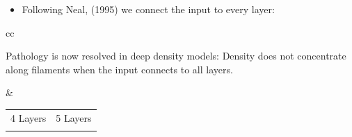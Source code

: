 \documentclass[portrait,a0b,final,a4resizeable]{include/a0poster}
\def\jointspacing{\vspace{0.3in}}
\begin{document}
\begin{poster}
\begin{multicols}{2}
\jointspacing
\jointspacing

\centering
\begin{itemize}
	\item Following {\color{mydarkblue} Neal, (1995)} we connect the input to every layer:
\end{itemize}

\jointspacing


\jointspacing

\newcommand{\gpdrawboxcon}[1]{
\setlength\fboxsep{0pt}
\hspace{-0.4in} 
\fbox{
\texttt{[image: ../../figures/connected\_deep\_sample\_seed\_0/deep\_sample\_connected\_layer\#1]}
}}

\begin{tabular}{cc}
\begin{minipage}[c]{0.4\columnwidth}
Pathology is now resolved in deep density models:
Density does not concentrate along filaments when the input connects to all layers.
\end{minipage}
&
\begin{minipage}[c]{0.45\columnwidth}
\centering
\begin{tabular}{cc}
 4 Layers & 5 Layers \\
\gpdrawboxcon{4} &
\gpdrawboxcon{5}
\end{tabular}
\end{minipage}
\end{tabular}

\jointspacing
\jointspacing

\vspace{0.3in}


\end{multicols}
\end{poster}
\end{document}

